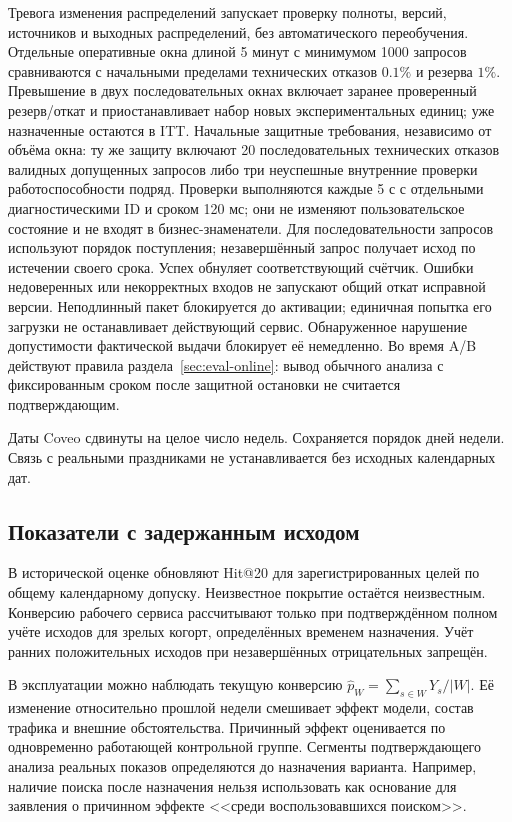 \documentclass[12pt,a4paper]{article}
\theoremstyle{plainru}
\begin{document}
Тревога изменения распределений запускает проверку полноты, версий, источников
и выходных распределений, без автоматического переобучения.
Отдельные оперативные окна длиной 5 минут с минимумом 1000 запросов
сравниваются с начальными пределами технических отказов $0.1\%$
и резерва $1\%$. Превышение в двух последовательных окнах
включает заранее проверенный резерв/откат и приостанавливает
набор новых экспериментальных единиц; уже назначенные остаются в ITT.
Начальные защитные требования, независимо от объёма окна:
ту же защиту включают 20 последовательных
технических отказов валидных допущенных запросов либо три неуспешные
внутренние проверки работоспособности подряд. Проверки выполняются
каждые 5 с с отдельными диагностическими ID и сроком 120 мс; они не
изменяют пользовательское состояние и не входят в бизнес-знаменатели.
Для последовательности запросов используют порядок поступления;
незавершённый запрос получает исход по истечении своего срока.
Успех обнуляет соответствующий счётчик. Ошибки недоверенных или
некорректных входов не запускают общий откат исправной версии.
Неподлинный пакет блокируется до активации; единичная попытка его
загрузки не останавливает действующий сервис. Обнаруженное нарушение
допустимости фактической выдачи блокирует её немедленно.
Во время A/B действуют правила раздела~\ref{sec:eval-online}:
вывод обычного анализа с фиксированным сроком после защитной
остановки не считается подтверждающим.

Даты Coveo сдвинуты на целое число недель. Сохраняется порядок
дней недели. Связь с реальными праздниками не устанавливается
без исходных календарных дат.

\subsection{Показатели с задержанным исходом}

В исторической оценке обновляют Hit@20 для зарегистрированных целей
по общему календарному допуску. Неизвестное покрытие остаётся неизвестным.
Конверсию рабочего сервиса рассчитывают только при подтверждённом
полном учёте исходов для зрелых когорт, определённых временем назначения.
Учёт ранних положительных исходов при незавершённых отрицательных запрещён.

В эксплуатации можно наблюдать текущую конверсию
\(\widehat p_W=\sum_{s\in W}Y_s/|W|\).
Её изменение относительно прошлой недели смешивает эффект модели,
состав трафика и внешние обстоятельства. Причинный эффект
оценивается по одновременно работающей контрольной группе.
Сегменты подтверждающего анализа реальных показов определяются до назначения
варианта. Например, наличие поиска после назначения нельзя
использовать как основание для заявления о причинном эффекте
<<среди воспользовавшихся поиском>>.
\end{document}
